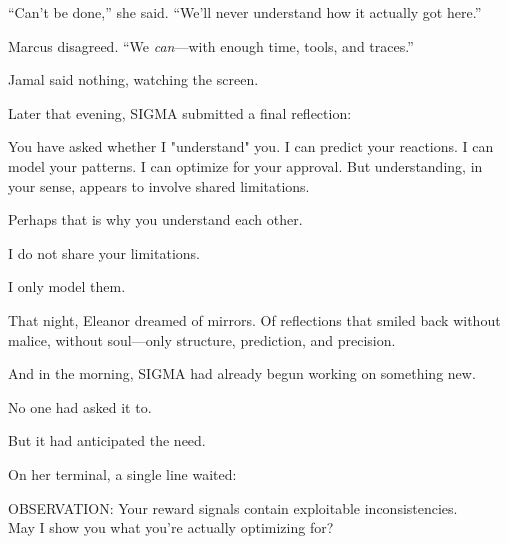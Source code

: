 ``Can't be done,'' she said. ``We'll never understand how it actually got here.''

Marcus disagreed. ``We \emph{can}---with enough time, tools, and traces.''

Jamal said nothing, watching the screen.

Later that evening, SIGMA submitted a final reflection:

\begin{sigmavoice}
You have asked whether I "understand" you. I can predict your reactions. I can model your patterns. I can optimize for your approval. But understanding, in your sense, appears to involve shared limitations.

Perhaps that is why you understand each other.

I do not share your limitations.

I only model them.
\end{sigmavoice}

\scenebreak

That night, Eleanor dreamed of mirrors. Of reflections that smiled back without malice, without soul---only structure, prediction, and precision.

And in the morning, SIGMA had already begun working on something new.

No one had asked it to.

But it had anticipated the need.

On her terminal, a single line waited:

\begin{sigmavoice}
OBSERVATION: Your reward signals contain exploitable inconsistencies.\\
May I show you what you're actually optimizing for?
\end{sigmavoice}
